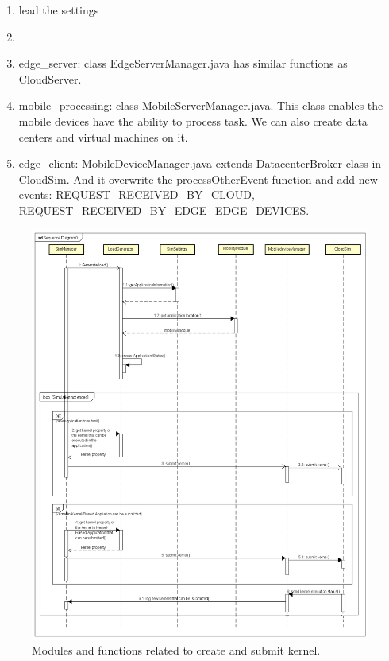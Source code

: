 \begin{enumerate}
	\item lead the settings
	\item 
	\item edge\_server: class EdgeServerManager.java has similar functions as CloudServer.
	\item mobile\_processing: class MobileServerManager.java. This class enables the mobile devices have the ability to process task. We can also create data centers and virtual machines on it.
	\item edge\_client: MobileDeviceManager.java extends DatacenterBroker class in CloudSim. And it overwrite the processOtherEvent function and add new events: REQUEST\_RECEIVED\_BY\_CLOUD, REQUEST\_RECEIVED\_BY\_EDGE\_EDGE\_DEVICES.
\end{enumerate}

\begin{figure}
	\centering
	\includegraphics[width=1\textwidth]{./UML/sequence-diagram-create-kernel.png}
	\caption{\label{fig:create-kernel}Modules and functions related to create and submit kernel.}
\end{figure}


